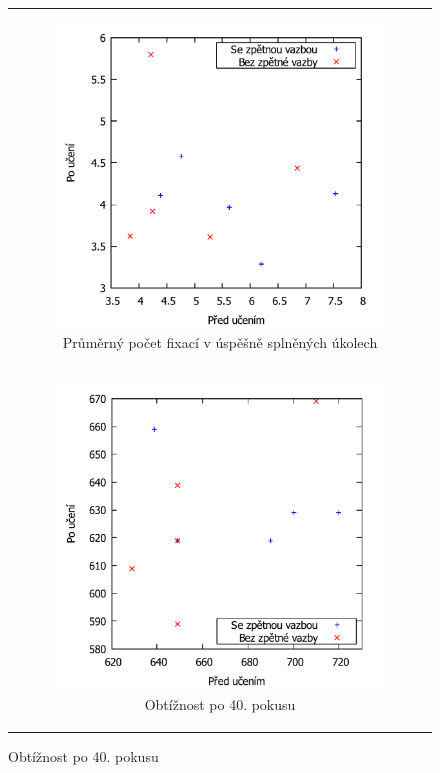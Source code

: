 \begin{figure}[h!]
\begin{tabular}{c}
\begin{subfigure}{0.80\textwidth}
\includegraphics[width=0.99\linewidth]{graphs/AverageSuccesfullTries}
\caption{Průměrný počet fixací v úspěšně splněných úkolech}
\end{subfigure}\\

\begin{subfigure}{0.80\textwidth}
\includegraphics[width=0.99\linewidth]{graphs/FinalDifficulty}
\caption{Obtížnost po 40. pokusu}
\end{subfigure}\\


\end{tabular}
\end{figure}
